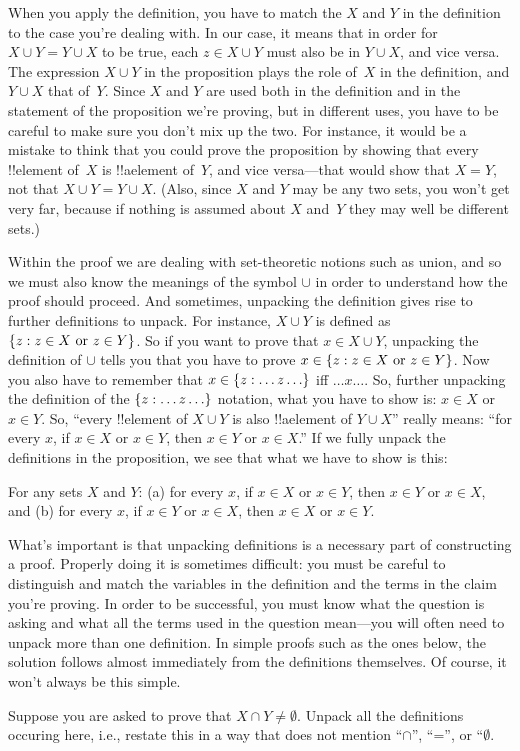 \documentclass[../../../include/open-logic-section]{subfiles}
\begin{document}
When you apply the definition, you have to match the $X$ and $Y$ in
the definition to the case you're dealing with.  In our case, it means
that in order for $X \cup Y = Y \cup X$ to be true, each $z \in X \cup
Y$ must also be in $Y \cup X$, and vice versa.  The expression $X \cup
Y$ in the proposition plays the role of~$X$ in the definition, and $Y
\cup X$ that of~$Y$. Since $X$ and $Y$ are used both in the definition
and in the statement of the proposition we're proving, but in
different uses, you have to be careful to make sure you don't mix up
the two.  For instance, it would be a mistake to think that you could
prove the proposition by showing that every !!{element} of~$X$ is
!!a{element} of~$Y$, and vice versa---that would show that $X = Y$,
not that $X \cup Y = Y \cup X$. (Also, since $X$ and $Y$ may be any
two sets, you won't get very far, because if nothing is assumed about
$X$ and~$Y$ they may well be different sets.)

Within the proof we are dealing with set-theoretic notions such as
union, and so we must also know the meanings of the symbol $\cup$ in
order to understand how the proof should proceed. And sometimes,
unpacking the definition gives rise to further definitions to
unpack. For instance, $X \cup Y$ is defined as $\{ z : z \in X
  \text{ or } z \in Y \}$. So if you want to prove that $x \in X \cup
Y$, unpacking the definition of $\cup$ tells you that you have to
prove $x \in \{ z : z \in X \text{ or } z \in Y \}$.  Now you also
have to remember that $x \in \Setabs{z}{\dots z\dots}$ iff $\dots
x\dots$.  So, further unpacking the definition of the
$\Setabs{z}{\dots z \dots}$ notation, what you have to show is: $x \in
X$ or $x \in Y$. So, ``every !!{element} of $X \cup Y$ is also
!!a{element} of $Y \cup X$'' really means: ``for every $x$, if $x \in
X$ or $x \in Y$, then $x \in Y$ or $x \in X$.''  If we fully
unpack the definitions in the proposition, we see that what we have to
show is this:

\begin{prop}
For any sets $X$ and $Y$: (a) for every $x$, if $x \in X$ or $x \in
Y$, then $x \in Y$ or $x \in X$, and (b) for every $x$, if $x \in Y$
or $x \in X$, then $x \in X$ or $x \in Y$.
\end{prop}

What's important is that unpacking definitions is a necessary part of
constructing a proof. Properly doing it is sometimes difficult: you
must be careful to distinguish and match the variables in the
definition and the terms in the claim you're proving.  In order to be
successful, you must know what the question is asking and what all the
terms used in the question mean---you will often need to unpack more
than one definition.  In simple proofs such as the ones below, the
solution follows almost immediately from the definitions
themselves. Of course, it won't always be this simple.

\begin{prob}
Suppose you are asked to prove that $X \cap Y \neq \emptyset$. Unpack
all the definitions occuring here, i.e., restate this in a way that
does not mention ``$\cap$'', ``='', or ``$\emptyset$.
\end{prob}
\end{document}
